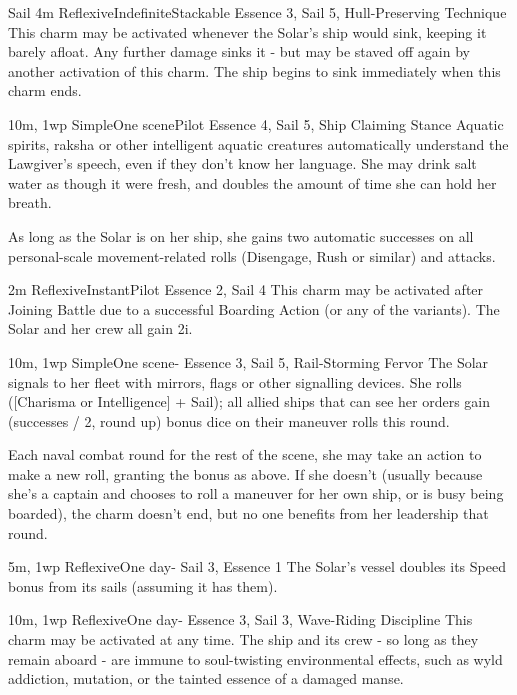 \begin{Ability}{Sail}
  {4m}
  {Reflexive}{Indefinite}{Stackable}
  {Essence 3, Sail 5, Hull-Preserving Technique}
  This charm may be activated whenever the Solar's ship would sink, keeping it barely afloat. Any further damage sinks it - but may be staved off again by another activation of this charm. The ship begins to sink immediately when this charm ends.

  {10m, 1wp}
  {Simple}{One scene}{Pilot}
  {Essence 4, Sail 5, Ship Claiming Stance}
  Aquatic spirits, raksha or other intelligent aquatic creatures automatically understand the Lawgiver's speech, even if they don't know her language. She may drink salt water as though it were fresh, and doubles the amount of time she can hold her breath.

  As long as the Solar is on her ship, she gains two automatic successes on all personal-scale movement-related rolls (Disengage, Rush or similar) and attacks.

  {2m}
  {Reflexive}{Instant}{Pilot}
  {Essence 2, Sail 4}
  This charm may be activated after Joining Battle due to a successful Boarding Action (or any of the variants). The Solar and her crew all gain 2i.

  {10m, 1wp}
  {Simple}{One scene}{-}
  {Essence 3, Sail 5, Rail-Storming Fervor}
  The Solar signals to her fleet with mirrors, flags or other signalling devices. She rolls ([Charisma or Intelligence] + Sail); all allied ships that can see her orders gain (successes / 2, round up) bonus dice on their maneuver rolls this round.

  Each naval combat round for the rest of the scene, she may take an action to make a new roll, granting the bonus as above. If she doesn't (usually because she's a captain and chooses to roll a maneuver for her own ship, or is busy being boarded), the charm doesn't end, but no one benefits from her leadership that round.

  {5m, 1wp}
  {Reflexive}{One day}{-}
  {Sail 3, Essence 1}
  The Solar's vessel doubles its Speed bonus from its sails (assuming it has them).

  {10m, 1wp}
  {Reflexive}{One day}{-}
  {Essence 3, Sail 3, Wave-Riding Discipline}
  This charm may be activated at any time. The ship and its crew - so long as they remain aboard - are immune to soul-twisting environmental effects, such as wyld addiction, mutation, or the tainted essence of a damaged manse.


\end{Ability}
